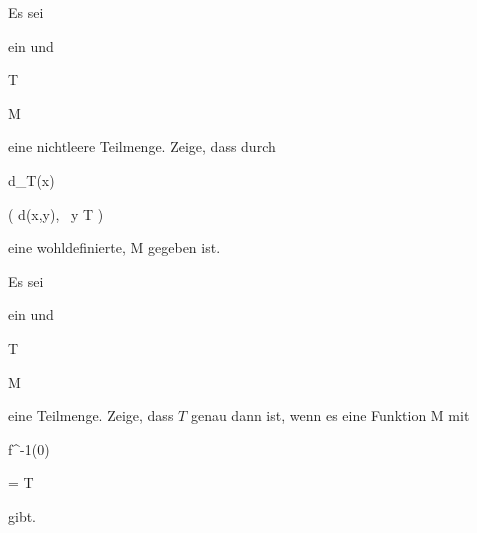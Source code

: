 {


Es sei


 ein
 und


\mavergleichskette


{\vergleichskette


{ T
}


{ \subseteq }{ M
}


{  }{
}


{    }{
}


{   }{
}


}
{}{}{}
eine nichtleere Teilmenge. Zeige, dass durch


\mavergleichskettedisp


{\vergleichskette


{ d_T(x)
}


{ } { \inf \left(  d(x,y), \, y \in T  \right)
}


{ } {
}


{ } {
}


{ } {
}


}
{}{}{}
eine wohldefinierte,
\maabb {} { M } {\R
} {}
gegeben ist.


}


{} {}




{}


{


Es sei


 ein
 und


\mavergleichskette


{\vergleichskette


{ T
}


{ \subseteq }{ M
}


{  }{
}


{    }{
}


{   }{
}


}
{}{}{}
eine  Teilmenge. Zeige, dass $T$ genau dann
ist, wenn es eine
Funktion
 { M } {\R
} {}
mit


\mavergleichskettedisp


{\vergleichskette


{f^{-1}(0)
}


{ =} { T
}


{ } {
}


{ } {
}


{ } {
}


}
{}{}{}
gibt.


}


